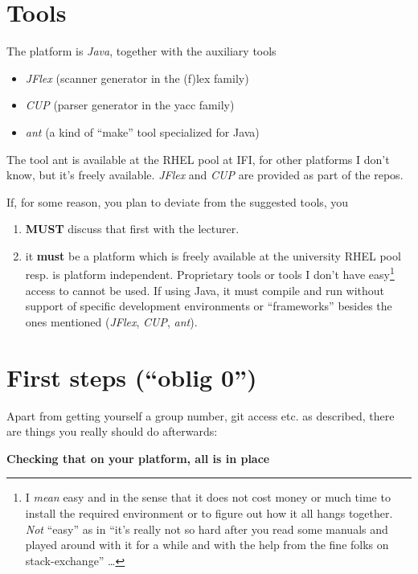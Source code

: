 \documentclass[10pt,freeform]{handout}[2014/08/13]
\begin{document}
\section{Tools}

The platform is \emph{Java}, together with the auxiliary tools

\begin{itemize}
\item \textsl{JFlex} (scanner generator in the (f)lex family)
\item \textsl{CUP} (parser generator in the yacc family)
\item \textsl{ant} (a kind of ``make'' tool specialized for Java)
\end{itemize}


The tool ant is available at the RHEL pool at IFI, for other platforms I
don't know, but it's freely available. \textsl{JFlex} and \textsl{CUP} are
provided as part of the repos.

If, for some reason, you plan to deviate from the suggested tools, you
\begin{enumerate}
\item \textbf{MUST} discuss that first with the lecturer.
\item it \textbf{must} be a platform which is freely available at the
  university RHEL pool resp. is platform independent. Proprietary tools or
  tools I don't have easy\footnote{I \emph{mean} easy and in the sense that
    it does not cost money or much time to install the required environment
    or to figure out how it all hangs together. \emph{Not} ``easy'' as in
    ``it's really not so hard after you read some manuals and played around
    with it for a while and with the help from the fine folks on
    stack-exchange'' \ldots} access to cannot be used. If using Java, it
  must compile and run without support of specific development environments
  or ``frameworks'' besides the ones mentioned (\textsl{JFlex},
  \textsl{CUP}, \textsl{ant}).
\end{enumerate}


\section{First steps (``oblig 0'')}
\label{sec:first-steps-oblig}

Apart from getting yourself a group number, git access etc. as described,
there are things you really should do afterwards:

\begin{center}
  \textbf{Checking that on your platform, all is in place}
\end{center}
\end{document}
